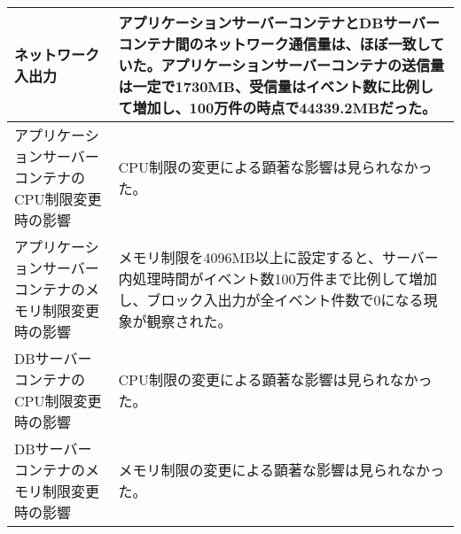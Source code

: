 \documentclass[../../../main]{subfiles}
\begin{document}
\begin{table}[H]
\begin{tabular}{|p{4cm}|p{10cm}|}
            ネットワーク入出力                    & アプリケーションサーバーコンテナとDBサーバーコンテナ間のネットワーク通信量は、ほぼ一致していた。アプリケーションサーバーコンテナの送信量は一定で1730MB、受信量はイベント数に比例して増加し、100万件の時点で44339.2MBだった。 \\ \hline
            アプリケーションサーバーコンテナのCPU制限変更時の影響 & CPU制限の変更による顕著な影響は見られなかった。                                                                                                \\ \hline
            アプリケーションサーバーコンテナのメモリ制限変更時の影響 & メモリ制限を4096MB以上に設定すると、サーバー内処理時間がイベント数100万件まで比例して増加し、ブロック入出力が全イベント件数で0になる現象が観察された。                                         \\ \hline
            DBサーバーコンテナのCPU制限変更時の影響       & CPU制限の変更による顕著な影響は見られなかった。                                                                                                \\ \hline
            DBサーバーコンテナのメモリ制限変更時の影響       & メモリ制限の変更による顕著な影響は見られなかった。                                                                                                \\ \hline
        \end{tabular}
    \end{table}
\end{document}
